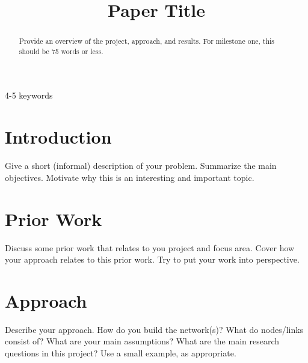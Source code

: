 \documentclass[conference]{IEEEtran}
\begin{document}
\title{Paper Title}

\author{
    \and
}

\maketitle

\begin{abstract}
    Provide an overview of the project, approach, and results. For milestone one, this should be 75 words or less.
\end{abstract}

\begin{IEEEkeywords}
    4-5 keywords
\end{IEEEkeywords}

\section{Introduction}
Give a short (informal) description of your problem. Summarize the main objectives. Motivate why this is an interesting and important topic.

\section{Prior Work}
Discuss some prior work that relates to you project and focus area. Cover how your approach relates to this prior work. Try to put your work into perspective.


\section{Approach}
Describe your approach. How do you build the network(s)? What do nodes/links consist of? What are your main assumptions? What are the main research questions in this project? Use a small example, as appropriate.
\end{document}
